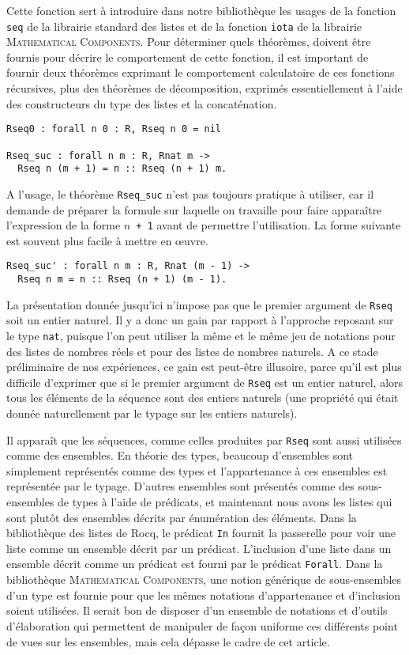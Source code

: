 \documentclass[draft]{jflart}
\newcommand{\mathcomp}{\textsc{Mathematical Components}}
\begin{document}
Cette fonction sert à introduire dans notre bibliothèque les usages
de la fonction \texttt{seq} de la librairie standard des listes et de la
fonction \texttt{iota} de la librairie \mathcomp{}.  Pour déterminer
quels théorèmes, doivent être fournis pour décrire le comportement de
cette fonction, il est important de fournir deux théorèmes exprimant
le comportement calculatoire de ces fonctions récursives, plus des
théorèmes de décomposition, exprimés essentiellement à l'aide des
constructeurs du type des listes et la concaténation.
\begin{verbatim}
Rseq0 : forall n 0 : R, Rseq n 0 = nil

Rseq_suc : forall n m : R, Rnat m ->
  Rseq n (m + 1) = n :: Rseq (n + 1) m.
\end{verbatim}
A l'usage, le théorème \texttt{Rseq\_suc} n'est pas toujours pratique à
utiliser, car il demande de préparer la formule sur laquelle on
travaille pour faire apparaître l'expression de la forme \texttt{\(n\) +
  1} avant de permettre l'utilisation.  La forme suivante est souvent
plus facile à mettre en œuvre.
\begin{verbatim}
Rseq_suc' : forall n m : R, Rnat (m - 1) ->
  Rseq n m = n :: Rseq (n + 1) (m - 1).
\end{verbatim}
La présentation donnée jusqu'ici n'impose pas que le premier argument
de \texttt{Rseq} soit un entier naturel.  Il y a donc un gain par rapport
à l'approche reposant sur le type \texttt{nat}, puisque l'on peut
utiliser la même et le même jeu de notations pour des listes de
nombres réels et pour des listes de nombres naturels.  A ce stade
préliminaire de nos expériences, ce gain est peut-être illusoire,
parce qu'il est plus difficile d'exprimer que si le premier argument
de \texttt{Rseq} est un entier naturel, alors tous les éléments de la
séquence sont des entiers naturels (une propriété qui était donnée
naturellement par le typage sur les entiers naturels).

Il apparaît que les séquences, comme celles produites par
\texttt{Rseq} sont aussi utilisées comme des ensembles.  En théorie des
types, beaucoup d'ensembles sont simplement représentés comme des
types et l'appartenance à ces ensembles est représentée par le typage.
D'autres ensembles sont présentés comme des sous-ensembles de types à
l'aide de prédicats, et maintenant nous avons les listes qui sont
plutôt des ensembles décrits par énumération des éléments.  Dans la
bibliothèque des listes de Rocq, le prédicat \texttt{In} fournit la
passerelle pour voir une liste comme un ensemble décrit par un prédicat.
L'inclusion d'une liste dans un
ensemble décrit comme un prédicat est fourni par le prédicat
\texttt{Forall}.  Dans la bibliothèque \mathcomp{}, une notion générique
de sous-ensembles d'un type est fournie pour que les mêmes notations
d'appartenance et d'inclusion soient utilisées.  Il serait bon de
disposer d'un ensemble de notations et d'outils d'élaboration qui
permettent de manipuler de façon uniforme ces différents point de vues
sur les ensembles, mais cela dépasse le cadre de cet article.
\end{document}
